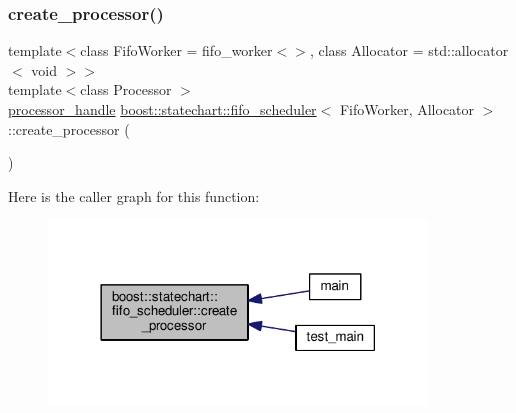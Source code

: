 \subsubsection{\texorpdfstring{create\+\_\+processor()}{create\_processor()}\hspace{0.1cm}{\footnotesize\ttfamily [1/7]}}
{\footnotesize\ttfamily template$<$class Fifo\+Worker = fifo\+\_\+worker$<$$>$, class Allocator = std\+::allocator$<$ void $>$$>$ \\
template$<$class Processor $>$ \\
\mbox{\hyperlink{classboost_1_1statechart_1_1fifo__scheduler_ada526939c16c4f8118bc4d7bbf09ad7d}{processor\+\_\+handle}} \mbox{\hyperlink{classboost_1_1statechart_1_1fifo__scheduler}{boost\+::statechart\+::fifo\+\_\+scheduler}}$<$ Fifo\+Worker, Allocator $>$\+::create\+\_\+processor (\begin{DoxyParamCaption}{ }\end{DoxyParamCaption})\hspace{0.3cm}{\ttfamily [inline]}}

Here is the caller graph for this function\+:
\nopagebreak
\begin{figure}[H]
\begin{center}
\leavevmode
\includegraphics[width=285pt]{classboost_1_1statechart_1_1fifo__scheduler_a95c23f26708dcf81e6c0f8c4618fc015_icgraph}
\end{center}
\end{figure}
\mbox{\label{classboost_1_1statechart_1_1fifo__scheduler_ac03c8e9f9a1485f60ac5c13bbe961f42}} 
